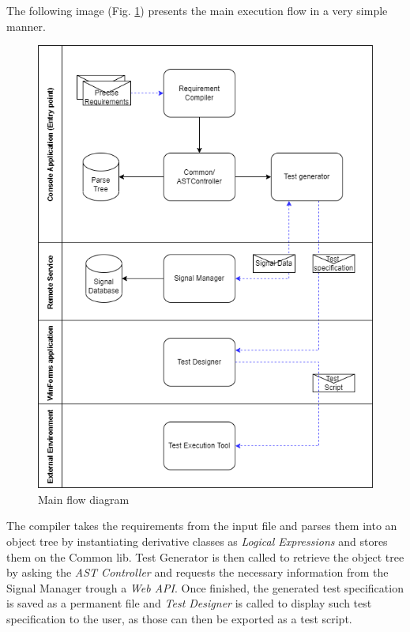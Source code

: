 The following image (Fig. \ref{fig:data_flow}) presents the main execution flow in a very simple manner. \\
\begin{figure}[H]
    \centering
    \includegraphics[scale=0.625]{images/sesnando_dataflow.png}
    \caption{Main flow diagram}
    \label{fig:data_flow}
\end{figure}

The compiler takes the requirements from the input file and parses them into an object tree by instantiating derivative classes as \textit{Logical Expressions} and stores them on the Common lib. Test Generator is then called to retrieve the object tree by asking the \textit{AST Controller} and requests the necessary information from the Signal Manager trough a \textit{Web API}. Once finished, the generated test specification is saved as a permanent file and \textit{Test Designer} is called to display such test specification to the user, as those can then be exported as a test script.